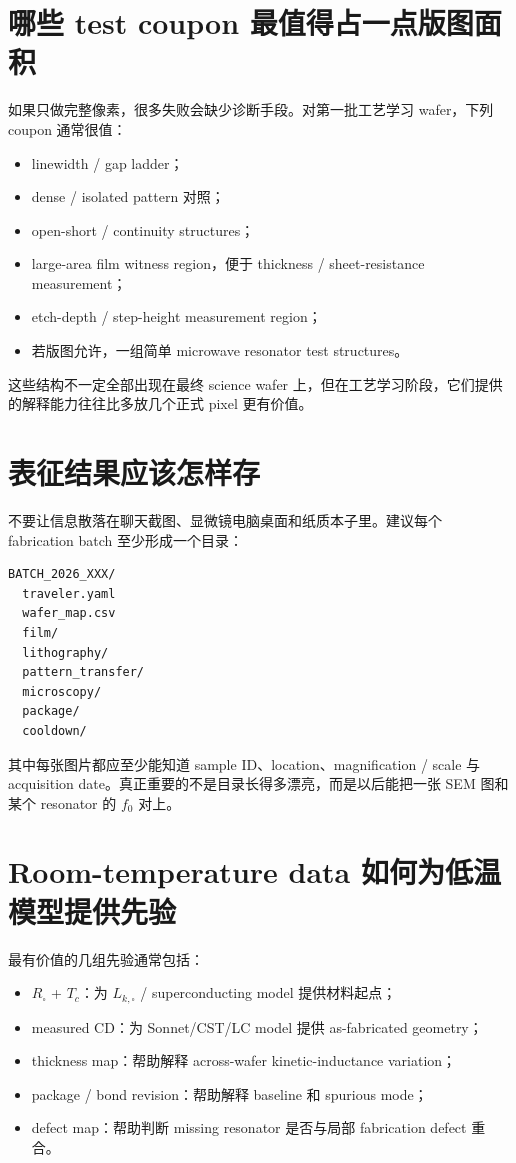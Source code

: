 \section{哪些 test coupon 最值得占一点版图面积}

如果只做完整像素，很多失败会缺少诊断手段。对第一批工艺学习 wafer，下列 coupon 通常很值：

\begin{itemize}
  \item linewidth / gap ladder；
  \item dense / isolated pattern 对照；
  \item open-short / continuity structures；
  \item large-area film witness region，便于 thickness / sheet-resistance measurement；
  \item etch-depth / step-height measurement region；
  \item 若版图允许，一组简单 microwave resonator test structures。
\end{itemize}

这些结构不一定全部出现在最终 science wafer 上，但在工艺学习阶段，它们提供的解释能力往往比多放几个正式 pixel 更有价值。

\section{表征结果应该怎样存}

不要让信息散落在聊天截图、显微镜电脑桌面和纸质本子里。建议每个 fabrication batch 至少形成一个目录：

\begin{verbatim}
BATCH_2026_XXX/
  traveler.yaml
  wafer_map.csv
  film/
  lithography/
  pattern_transfer/
  microscopy/
  package/
  cooldown/
\end{verbatim}

其中每张图片都应至少能知道 sample ID、location、magnification / scale 与 acquisition date。真正重要的不是目录长得多漂亮，而是以后能把一张 SEM 图和某个 resonator 的 $f_0$ 对上。

\section{Room-temperature data 如何为低温模型提供先验}

最有价值的几组先验通常包括：

\begin{itemize}
  \item $R_\square$ + $T_c$：为 $L_{k,\square}$ / superconducting model 提供材料起点；
  \item measured CD：为 Sonnet/CST/LC model 提供 as-fabricated geometry；
  \item thickness map：帮助解释 across-wafer kinetic-inductance variation；
  \item package / bond revision：帮助解释 baseline 和 spurious mode；
  \item defect map：帮助判断 missing resonator 是否与局部 fabrication defect 重合。
\end{itemize}

